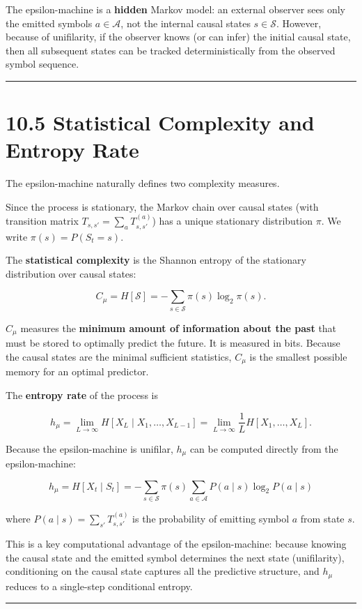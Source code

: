 \begin{remark}
The epsilon-machine is a \textbf{hidden} Markov model: an external observer sees only the emitted symbols $a \in \mathcal{A}$, not the internal causal states $s \in \mathcal{S}$. However, because of unifilarity, if the observer knows (or can infer) the initial causal state, then all subsequent states can be tracked deterministically from the observed symbol sequence.

\bigskip\hrule\bigskip
\end{remark}

\section{10.5 Statistical Complexity and Entropy Rate}

The epsilon-machine naturally defines two complexity measures.

\begin{definition}
Since the process is stationary, the Markov chain over causal states (with transition matrix $T_{s,s'} = \sum_{a} T^{(a)}_{s,s'}$) has a unique stationary distribution $\pi$. We write $\pi(s) = P(S_t = s)$.
\end{definition}

\begin{definition}
The \textbf{statistical complexity} is the Shannon entropy of the stationary distribution over causal states:

\[
C_\mu = H[\mathcal{S}] = -\sum_{s \in \mathcal{S}} \pi(s) \log_2 \pi(s).
\]

$C_\mu$ measures the \textbf{minimum amount of information about the past} that must be stored to optimally predict the future. It is measured in bits. Because the causal states are the minimal sufficient statistics, $C_\mu$ is the smallest possible memory for an optimal predictor.
\end{definition}

\begin{definition}
The \textbf{entropy rate} of the process is

\[
h_\mu = \lim_{L \to \infty} H[X_L \mid X_1, \ldots, X_{L-1}] = \lim_{L \to \infty} \frac{1}{L} H[X_1, \ldots, X_L].
\]

Because the epsilon-machine is unifilar, $h_\mu$ can be computed directly from the epsilon-machine:

\[
h_\mu = H[X_t \mid S_t] = -\sum_{s \in \mathcal{S}} \pi(s) \sum_{a \in \mathcal{A}} P(a \mid s) \log_2 P(a \mid s)
\]

where $P(a \mid s) = \sum_{s'} T^{(a)}_{s,s'}$ is the probability of emitting symbol $a$ from state $s$.

This is a key computational advantage of the epsilon-machine: because knowing the causal state and the emitted symbol determines the next state (unifilarity), conditioning on the causal state captures all the predictive structure, and $h_\mu$ reduces to a single-step conditional entropy.

\bigskip\hrule\bigskip
\end{definition}

